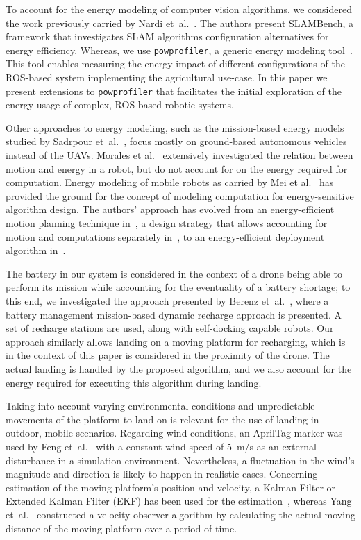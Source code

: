 \documentclass[conference]{IEEEtran}
\newcommand{\stt}[1]{{\small\tt #1}} %
\newcommand{\powprof}{\stt{powprofiler}}
\begin{document}
%
To account for the energy modeling of computer vision algorithms, we
considered the work previously carried by Nardi
et~al.~\cite{nardi2015introducing}. The authors present SLAMBench, a
framework that investigates SLAM algorithms configuration alternatives
for energy efficiency. Whereas, we use \powprof{}, a generic energy
modeling tool~\cite{seewald2019coarse}. This tool enables measuring
the energy impact of different configurations of the ROS-based system
implementing the agricultural use-case. In this paper we present
extensions to \powprof{} that facilitates the initial exploration of
the energy usage of complex, ROS-based robotic systems.

Other approaches to energy modeling, such as the mission-based energy
models studied by Sadrpour et~al.~\cite{sadrpour2013experimental,
  sadrpour2013mission}, focus mostly on ground-based autonomous
vehicles instead of the UAVs. Morales et al.~\cite{morales2009power}
extensively investigated the relation between motion and energy in a
robot, but do not account for on the energy required for computation.
%
Energy modeling of mobile robots as carried by Mei et
al.~\cite{mei2006deployment, mei2005case, mei2004energy} has provided
the ground for the concept of modeling computation for
energy-sensitive algorithm design. The authors' approach has evolved
from an energy-efficient motion planning technique
in~\cite{mei2004energy}, a design strategy that allows accounting for
motion and computations separately in~\cite{mei2005case}, to an
energy-efficient deployment algorithm in~\cite{mei2006deployment}.

The battery in our system is considered in the context of a drone
being able to perform its mission while accounting for the eventuality
of a battery shortage; to this end, we investigated the approach
presented by Berenz et~al.~\cite{berenz2012autonomous}, where a
battery management mission-based dynamic recharge approach is
presented. A set of recharge stations are used, along with
self-docking capable robots. Our approach similarly allows landing on
a moving platform for recharging, which is in the context of this
paper is considered in the proximity of the drone. The actual landing
is handled by the proposed algorithm, and we also account for the
energy required for executing this algorithm during landing.
%

Taking into account varying environmental conditions and unpredictable
movements of the platform to land on is relevant for the use of
landing in outdoor, mobile scenarios.  Regarding wind conditions, an
AprilTag marker was used by Feng et~al.~\cite{feng2018autonomous} with
a constant wind speed of 5~m/s as an external disturbance in a
simulation environment. Nevertheless, a fluctuation in the wind's
magnitude and direction is likely to happen in realistic cases.
Concerning estimation of the moving platform's position and velocity,
a Kalman Filter or Extended Kalman Filter (EKF) has been used for the
estimation~\cite{araar2017vision,feng2018autonomous,
  falanga2017vision}, whereas Yang et~al.~\cite{yang2018hybrid}
constructed a velocity observer algorithm by calculating the actual
moving distance of the moving platform over a period of time.
\end{document}
